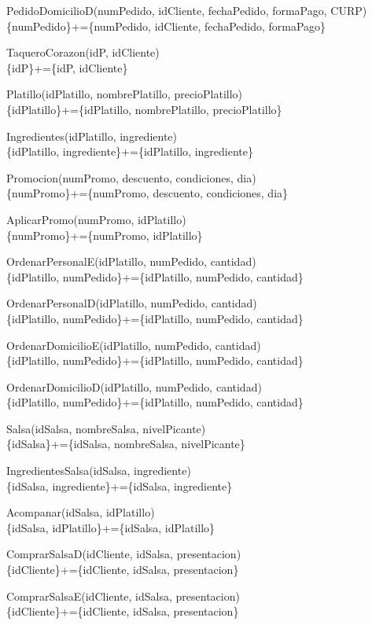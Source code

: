 \documentclass[a4paper, 12pt]{report}
\begin{document}
PedidoDomicilioD(numPedido, idCliente, fechaPedido, formaPago, CURP)\\
\{numPedido\}+=\{numPedido, idCliente, fechaPedido, formaPago\}

TaqueroCorazon(idP, idCliente)\\
\{idP\}+=\{idP, idCliente\}

Platillo(idPlatillo, nombrePlatillo, precioPlatillo)\\
\{idPlatillo\}+=\{idPlatillo, nombrePlatillo, precioPlatillo\}

Ingredientes(idPlatillo, ingrediente)\\
\{idPlatillo, ingrediente\}+=\{idPlatillo, ingrediente\}

Promocion(numPromo, descuento, condiciones, dia)\\
\{numPromo\}+=\{numPromo, descuento, condiciones, dia\}

AplicarPromo(numPromo, idPlatillo)\\
\{numPromo\}+=\{numPromo, idPlatillo\}

OrdenarPersonalE(idPlatillo, numPedido, cantidad)\\
\{idPlatillo, numPedido\}+=\{idPlatillo, numPedido, cantidad\}

OrdenarPersonalD(idPlatillo, numPedido, cantidad)\\
\{idPlatillo, numPedido\}+=\{idPlatillo, numPedido, cantidad\}

OrdenarDomicilioE(idPlatillo, numPedido, cantidad)\\
\{idPlatillo, numPedido\}+=\{idPlatillo, numPedido, cantidad\}

OrdenarDomicilioD(idPlatillo, numPedido, cantidad)\\
\{idPlatillo, numPedido\}+=\{idPlatillo, numPedido, cantidad\}

Salsa(idSalsa, nombreSalsa, nivelPicante)\\
\{idSalsa\}+=\{idSalsa, nombreSalsa, nivelPicante\}

IngredientesSalsa(idSalsa, ingrediente)\\
\{idSalsa, ingrediente\}+=\{idSalsa, ingrediente\}

Acompanar(idSalsa, idPlatillo)\\
\{idSalsa, idPlatillo\}+=\{idSalsa, idPlatillo\}

ComprarSalsaD(idCliente, idSalsa, presentacion)\\
\{idCliente\}+=\{idCliente, idSalsa, presentacion\}

ComprarSalsaE(idCliente, idSalsa, presentacion)\\
\{idCliente\}+=\{idCliente, idSalsa, presentacion\}
\end{document}
